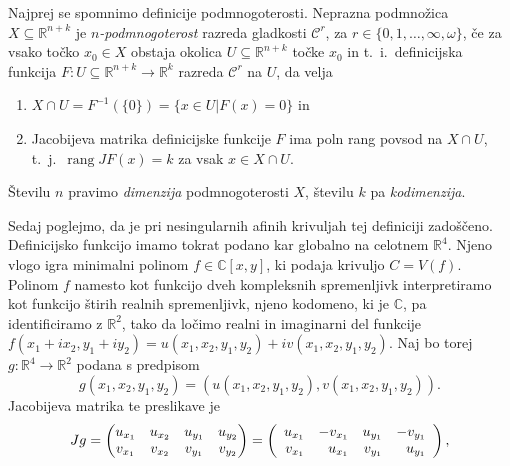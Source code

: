 \documentclass[mat1]{fmfdelo}
\newcommand{\tikzmark}[1]{\tikz[overlay,remember picture,baseline=(#1.base)]
  \node (#1) {\strut};}
\newcommand{\R}{\mathbb R}
\newcommand{\C}{\mathbb C}
\DeclareMathOperator{\rang}{rang}
\theoremstyle{definition}
\begin{document}
\begin{dokaz}
    Najprej se spomnimo definicije podmnogoterosti. Neprazna podmnožica $X \subseteq \R^{n+k}$ je \emph{$n$-podmnogoterost} razreda gladkosti $\mathcal{C}^r$, za $r \in \{0,1,\dots, \infty, \omega\}$, če za vsako točko $x_0 \in X$ obstaja okolica $U \subseteq \R^{n+k}$ točke $x_0$ in t.~i.\ definicijska funkcija $F: U \subseteq \R^{n+k} \to \R^k$ razreda $\mathcal{C}^r$ na $U$, da velja
    \begin{enumerate}
        \item $X \cap U = F^{-1}(\{0\}) = \{x \in U | F(x) = 0\}$ in
        \item Jacobijeva matrika definicijske funkcije $F$ ima poln rang povsod na $X \cap U$, t.~j.\  $\rang JF(x) = k$ za vsak $x \in X \cap U$.
    \end{enumerate}
    Številu $n$ pravimo \emph{dimenzija} podmnogoterosti $X$, številu $k$ pa \emph{kodimenzija}.
    \\
    \par
    Sedaj poglejmo, da je pri nesingularnih afinih krivuljah tej definiciji zadoščeno. Definicijsko funkcijo imamo tokrat podano kar globalno na celotnem $\R^4$. Njeno vlogo igra minimalni polinom $f \in \C[x,y]$, ki podaja krivuljo $C = V(f)$. Polinom $f$ namesto kot funkcijo dveh kompleksnih spremenljivk interpretiramo kot funkcijo štirih realnih spremenljivk, njeno kodomeno, ki je $\C$, pa identificiramo z $\R^2$, tako da ločimo realni in imaginarni del funkcije $f(x_1 + ix_2, y_1 + iy_2) = u(x_1,x_2,y_1,y_2) + iv(x_1,x_2,y_1,y_2)$. Naj bo torej $g: \R^4 \to \R^2$ podana s predpisom
    \[
        g(x_1,x_2,y_1,y_2) = (u(x_1,x_2,y_1,y_2), v(x_1,x_2,y_1,y_2)).
    \]
    Jacobijeva matrika te preslikave je
    \[
    Jg = 
    \begin{pmatrix}
        u_{x_1} & u_{x_2} & u_{y_1} & u_{y_2} \\
        v_{x_1} & v_{x_2} & v_{y_1} & v_{y_2}
    \end{pmatrix}
    =
    \left (
        \begin{array}{rrrr}
            u_{x_1} & -v_{x_1} & u_{y_1} & -v_{y_1} \\
            \tikzmark{lower1} v_{x_1} & u_{x_1}\tikzmark{lower2} & \tikzmark{lower3} v_{y_1} & u_{y_1} \tikzmark{lower4}\\
        \end{array}
    \right ),
    \]
        

\end{dokaz}
\end{document}
